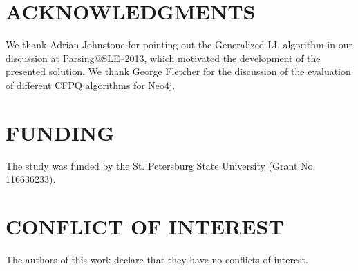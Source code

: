 \documentclass[
11pt,%
tightenlines,%
twoside,%
onecolumn,%
nobibnotes,%
nofootinbib,%
superscriptaddress,%
noshowpacs,%
longbibliography,%
centertags]%
{revtex4-2}
\begin{document}
\section*{ACKNOWLEDGMENTS}
We thank Adrian Johnstone for pointing out the Generalized LL algorithm in our discussion at Parsing@SLE--2013, which motivated the development of the presented solution. We thank George Fletcher for the discussion of the evaluation of different CFPQ algorithms for Neo4j.

\section*{FUNDING}
The study was funded by the St. Petersburg State University (Grant No. 116636233). 

\section*{CONFLICT OF INTEREST}
The authors of this work declare that they have no conflicts of interest.

%
%
%
\end{document}
